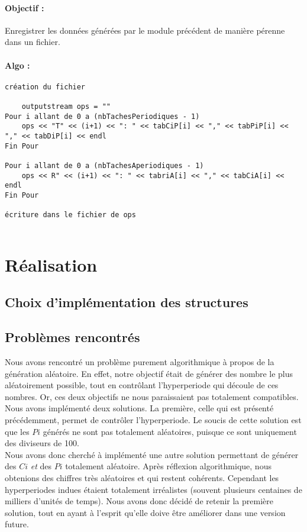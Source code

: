 		\paragraph{Objectif :} Enregistrer les données générées par le module précédent de manière pérenne dans un fichier.
		\paragraph{Algo :}
		\begin{verbatim}
création du fichier

	outputstream ops = ""
Pour i allant de 0 a (nbTachesPeriodiques - 1)		
	ops << "T" << (i+1) << ": " << tabCiP[i] << "," << tabPiP[i] << "," << tabDiP[i] << endl
Fin Pour

Pour i allant de 0 a (nbTachesAperiodiques - 1)
	ops << R" << (i+1) << ": " << tabriA[i] << "," << tabCiA[i] << endl
Fin Pour

écriture dans le fichier de ops
  
		\end{verbatim}

\section{Réalisation}
	\subsection{Choix d'implémentation des structures}
	
	\subsection{Problèmes rencontrés}
		Nous avons rencontré un problème purement algorithmique à propos de la génération aléatoire. En effet, notre objectif était de générer des nombre le plus aléatoirement possible, tout en contrôlant l'hyperperiode qui découle de ces nombres. Or, ces deux objectifs ne nous paraissaient pas totalement compatibles.\\
		
		Nous avons implémenté deux solutions. La première, celle qui est présenté précédemment, permet de contrôler l'hyperperiode. Le soucis de cette solution est que les $Pi$ générés ne sont pas totalement aléatoires, puisque ce sont uniquement des diviseurs de 100.\\
		
		Nous avons donc cherché à implémenté une autre solution permettant de générer des $Ci$ \emph{et} des $Pi$ totalement aléatoire. Après réflexion algorithmique, nous obtenions des chiffres très aléatoires et qui restent cohérents. Cependant les hyperperiodes indues étaient totalement irréalistes (souvent plusieurs centaines de milliers d'unités de temps). Nous avons donc décidé de retenir la première solution, tout en ayant à l'esprit qu'elle doive être améliorer dans une version future.

